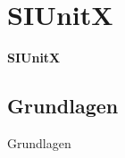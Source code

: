 \section{SIUnitX}
\begin{frame}[c]
	\begin{center}
		\LARGE \textbf{SIUnitX}
	\end{center}
\end{frame}
\subsection{Grundlagen}
\begin{frame}[c]
	\begin{center}
		\large Grundlagen
	\end{center}
\end{frame}


